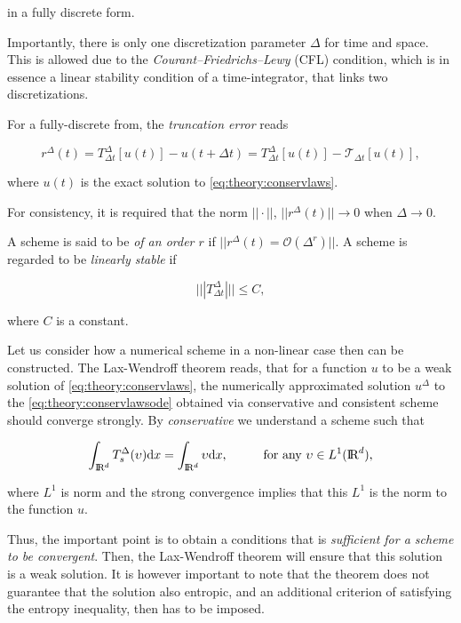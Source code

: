 in a fully discrete form.

Importantly, there is only one discretization parameter $\Delta$ for time and space. 
This is allowed due to the \textit{Courant–Friedrichs–Lewy} (CFL) condition, which is in essence a linear stability condition of a time-integrator, that links two discretizations. 

For a fully-discrete from, the \textit{truncation error} reads 

\begin{equation}
r^{\Delta}(t) = T^{\Delta}_{\Delta t}[u(t)] - u(t + \Delta t) = T^{\Delta}_{\Delta t}[u(t)] - \mathcal{T}_{\Delta t}[u(t)],
\end{equation}

where $u(t)$ is the exact solution to \ref{eq:theory:conservlaws}. 

For consistency, it is required that the norm $||\cdot||$, $||r^{\Delta}(t)||\rightarrow 0$ when $\Delta\rightarrow 0$. 

A scheme is said to be \textit{ of an order $r$ } if $||r^{\Delta}(t) = \mathcal{O}(\Delta^r)||$. 
A scheme is regarded to be \textit{linearly stable} if 

\begin{equation}
|||T^{\Delta}_{\Delta t}||| \leq C,
\end{equation}

where $C$ is a constant. 

Let us consider how a numerical scheme in a non-linear case then can be constructed. 
The Lax-Wendroff theorem \cite{Lax:1960} reads, that for a function $u$ to be a weak solution of \ref{eq:theory:conservlaws}, the numerically approximated solution $u^{\Delta}$ to the \ref{eq:theory:conservlawsode} obtained via conservative and consistent scheme should converge strongly. 
By \textit{conservative} we understand a scheme such that 

\begin{equation}
\int_{\text{I\!R}^d} T^{\Delta}_s(\upsilon)\text{d}x = \int_{\text{I\!R}^d}\upsilon\text{d}x, \hspace{10mm} \text{for any } \upsilon\in L^1(\text{I\!R}^d),
\end{equation}

where $L^1$ is norm and the strong convergence implies that this $L^1$ is the norm to the function $u$. 

Thus, the important point is to obtain a conditions that is \textit{sufficient for a scheme to be convergent}. 
Then, the Lax-Wendroff theorem will ensure that this solution is a weak solution. 
It is however important to note that the theorem does not guarantee that the solution also entropic, and an additional criterion of satisfying the entropy inequality, then has to be imposed. 

